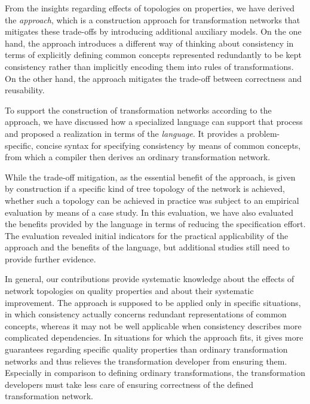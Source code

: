 From the insights regarding effects of topologies on properties, we have derived the \emph{\commonalities approach}, which is a construction approach for transformation networks that mitigates these trade-offs by introducing additional auxiliary models.
On the one hand, the approach introduces a different way of thinking about consistency in terms of explicitly defining common concepts represented redundantly to be kept consistency rather than implicitly encoding them into rules of transformations.
On the other hand, the approach mitigates the trade-off between correctness and reusability.

To support the construction of transformation networks according to the \commonalities approach, we have discussed how a specialized language can support that process and proposed a realization in terms of the \emph{\commonalities language}.
It provides a problem-specific, concise syntax for specifying consistency by means of common concepts, from which a compiler then derives an ordinary transformation network.

While the trade-off mitigation, as the essential benefit of the approach, is given by construction if a specific kind of tree topology of the network is achieved, whether such a topology can be achieved in practice was subject to an empirical evaluation by means of a case study.
In this evaluation, we have also evaluated the benefits provided by the \commonalities language in terms of reducing the specification effort.
The evaluation revealed initial indicators for the practical applicability of the approach and the benefits of the language, but additional studies still need to provide further evidence.

In general, our contributions provide systematic knowledge about the effects of network topologies on quality properties and about their systematic improvement.
The \commonalities approach is supposed to be applied only in specific situations, in which consistency actually concerns redundant representations of common concepts, whereas it may not be well applicable when consistency describes more complicated dependencies.
In situations for which the approach fits, it gives more guarantees regarding specific quality properties than ordinary transformation networks and thus relieves the transformation developer from ensuring them.
Especially in comparison to defining ordinary transformations, the transformation developers must take less care of ensuring correctness of the defined transformation network.

